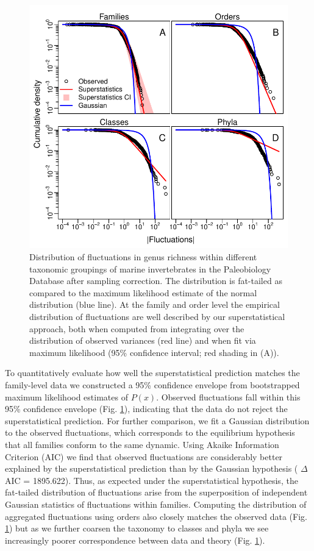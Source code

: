 \documentclass[12pt]{article}
\let\citep=\cite
\begin{document}
\begin{figure}[!h]
  \centering
  \includegraphics[scale=1]{../../fig_Px.pdf} 
  \caption[Clade-level distribution of richness
  fluctuations]{Distribution of fluctuations in genus richness within
    different taxonomic groupings of marine invertebrates in the
    Paleobiology Database \citep{alroy08} after sampling
    correction. The distribution is fat-tailed as compared to the
    maximum likelihood estimate of the normal distribution (blue
    line).  At the family and order level the empirical distribution
    of fluctuations are well described by our superstatistical
    approach, both when computed from integrating over the
    distribution of observed variances (red line) and when fit via
    maximum likelihood (95\% confidence interval; red shading in
    (A)).}
  \label{fig:Px}
\end{figure}

To quantitatively evaluate how well the superstatistical prediction
matches the family-level data we constructed a 95\% confidence
envelope from bootstrapped maximum likelihood estimates of
$P(x)$. Observed fluctuations fall within this 95\% confidence
envelope (Fig. \ref{fig:Px}), indicating that the data do not reject
the superstatistical prediction. For further comparison, we fit a
Gaussian distribution to the observed fluctuations, which corresponds
to the equilibrium hypothesis that all families conform to the same
dynamic. Using Akaike Information Criterion (AIC) we find that
observed fluctuations are considerably better explained by the
superstatistical prediction than by the Gaussian hypothesis ({\small
  $\Delta$}AIC = 1895.622). Thus, as expected under the
superstatistical hypothesis, the fat-tailed distribution of
fluctuations arise from the superposition of independent Gaussian
statistics of fluctuations within families.  Computing the
distribution of aggregated fluctuations using orders also closely
matches the observed data (Fig. \ref{fig:Px}) but as we further
coarsen the taxonomy to classes and phyla we see increasingly poorer
correspondence between data and theory (Fig. \ref{fig:Px}).
\end{document}
